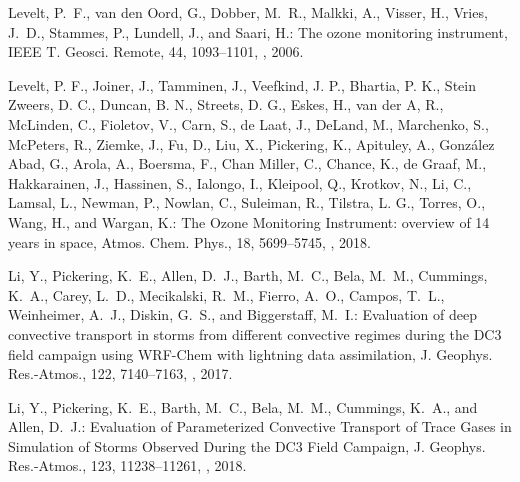 \documentclass[amt]{copernicus}
\begin{document}
\begin{thebibliography}{105}
Levelt, P.~F., {van den Oord}, G., Dobber, M.~R., Malkki, A., Visser, H.,
  Vries, J.~D., Stammes, P., Lundell, J., and Saari, H.: The ozone monitoring
  instrument, IEEE T. Geosci. Remote, 44,
  1093--1101, , 2006.

Levelt, P. F., Joiner, J., Tamminen, J., Veefkind, J. P., Bhartia, P. K., Stein Zweers, D. C., Duncan, B. N., Streets, D. G., Eskes, H., van der A, R., McLinden, C., Fioletov, V., Carn, S., de Laat, J., DeLand, M., Marchenko, S., McPeters, R., Ziemke, J., Fu, D., Liu, X., Pickering, K., Apituley, A., González Abad, G., Arola, A., Boersma, F., Chan Miller, C., Chance, K., de Graaf, M., Hakkarainen, J., Hassinen, S., Ialongo, I., Kleipool, Q., Krotkov, N., Li, C., Lamsal, L., Newman, P., Nowlan, C., Suleiman, R., Tilstra, L. G., Torres, O., Wang, H., and Wargan, K.: The Ozone Monitoring Instrument: overview of 14 years in space, Atmos. Chem. Phys., 18, 5699–5745, , 2018.

Li, Y., Pickering, K.~E., Allen, D.~J., Barth, M.~C., Bela, M.~M., Cummings,
  K.~A., Carey, L.~D., Mecikalski, R.~M., Fierro, A.~O., Campos, T.~L.,
  Weinheimer, A.~J., Diskin, G.~S., and Biggerstaff, M.~I.: Evaluation of deep
  convective transport in storms from different convective regimes during the
  DC3 field campaign using WRF-Chem with lightning data assimilation, J. Geophys. Res.-Atmos., 122, 7140--7163,
  , 2017.

Li, Y., Pickering, K.~E., Barth, M.~C., Bela, M.~M., Cummings, K.~A., and
  Allen, D.~J.: Evaluation of Parameterized Convective Transport of Trace Gases
  in Simulation of Storms Observed During the DC3 Field Campaign, J. Geophys. Res.-Atmos., 123, 11238--11261,
  , 2018.


\end{thebibliography}
\end{document}
